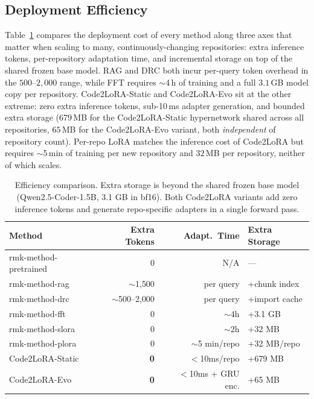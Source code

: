 \documentclass[11pt]{article}
\newcommand{\UseMacro}[1]{\csname rmk-#1\endcsname}
\newcommand{\codelora}{Code2LoRA\xspace}
\newcommand{\codelorastatic}{\codelora-Static\xspace}
\newcommand{\codeloraevo}{\codelora-Evo\xspace}
\begin{document}
\subsection{Deployment Efficiency}
\label{app:efficiency}

Table~\ref{tab:efficiency} compares the deployment cost of every method along three axes that matter when scaling to many, continuously-changing repositories: extra inference tokens, per-repository adaptation time, and incremental storage on top of the shared frozen base model.
RAG and DRC both incur per-query token overhead in the $500$--$2{,}000$ range, while FFT requires $\sim$4\,h of training and a full $3.1$\,GB model copy per repository.
\codelorastatic{} and \codeloraevo{} sit at the other extreme: zero extra inference tokens, sub-10\,ms adapter generation, and bounded extra storage ($679$\,MB for the \codelorastatic{} hypernetwork shared across all repositories, $65$\,MB for the \codeloraevo{} variant, both \emph{independent} of repository count).
Per-repo LoRA matches the inference cost of \codelora{} but requires $\sim$5\,min of training per new repository and $32$\,MB per repository, neither of which scales.

\begin{table}[t]
\begin{small}
\begin{center}
\caption{Efficiency comparison. Extra storage is beyond the shared frozen base model (Qwen2.5-Coder-1.5B, 3.1 GB in bf16). Both \codelora{} variants add zero inference tokens and generate repo-specific adapters in a single forward pass.}\label{tab:efficiency}

\begin{tabular}{lrrl}
\toprule
Method & Extra Tokens & Adapt.\ Time & Extra Storage \\
\midrule
\UseMacro{method-pretrained} & 0 & N/A & --- \\
\UseMacro{method-rag} & $\sim$1{,}500 & per query & +chunk index \\
\UseMacro{method-drc} & $\sim$500--2{,}000 & per query & +import cache \\
\UseMacro{method-fft} & 0 & $\sim$4h & +3.1 GB \\
\UseMacro{method-slora} & 0 & $\sim$2h & +32 MB \\
\UseMacro{method-plora} & 0 & $\sim$5 min/repo & +32 MB/repo \\
\codelorastatic{} & \textbf{0} & $<$10ms/repo & +679 MB \\
\codeloraevo{} & \textbf{0} & $<$10ms + GRU enc. & +65 MB \\
\bottomrule
\end{tabular}


\end{center}
\end{small}
\end{table}
\end{document}
